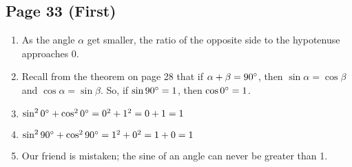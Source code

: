 \documentclass{article}
\newenvironment{solutions}[1]
{\subsection*{#1}
 \begin{enumerate}[leftmargin=1.5em]}
{\end{enumerate}}
\newcommand{\solution}{\item}
\begin{document}
\begin{solutions}{Page 33 (First)}
\solution %
As the angle $\alpha$ get smaller, the ratio of the opposite side to the hypotenuse approaches 0.

\solution %
Recall from the theorem on page 28 that if $\alpha + \beta = 90\degree$, then $\sin{\alpha} = \cos{\beta}$ and $\cos{\alpha} = \sin{\beta}$. So, if $\sin{90\degree} = 1$, then $\cos{0\degree} = 1$.

\solution %
$\sin^{2}{0\degree} + \cos^{2}{0\degree} = 0^2 + 1^2 = 0 + 1 = 1$

\solution %
$\sin^{2}{90\degree} + \cos^{2}{90\degree} = 1^2 + 0^2 = 1 + 0 = 1$

\solution %
Our friend is mistaken; the sine of an angle can never be greater than 1.
\end{solutions}
\end{document}

